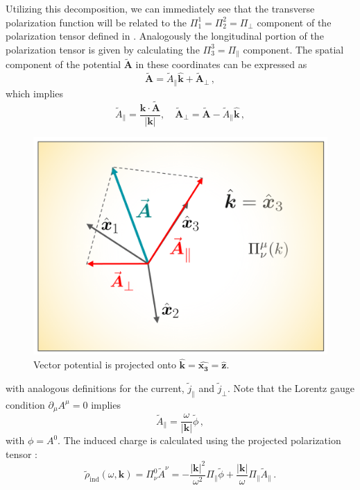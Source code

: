 Utilizing this decomposition, we can immediately see that the transverse polarization function will be related to the $\Pi^1_1 = \Pi^2_2 = \Pi_\perp$ component of the polarization tensor defined in . Analogously the longitudinal portion of the polarization tensor is given by calculating the $\Pi^3_3 = \Pi_\parallel$ component. The spatial component of the potential $\widetilde{\boldsymbol{A}}$  in these coordinates can be expressed as
\begin{equation}
\widetilde{\boldsymbol{A}} = \widetilde{A}_\parallel \hat{\boldsymbol{k}} + \widetilde{\boldsymbol{A}}_\perp\,,
\end{equation}
which implies
\begin{equation}
 \widetilde{A}_{\parallel} = \frac{\boldsymbol{k} \cdot  \widetilde{\boldsymbol{A}}}{|\boldsymbol{k}|}, \quad   \widetilde{\boldsymbol{A}}_{\perp} = \widetilde{\boldsymbol{A}} -  \widetilde{A}_{\parallel}\hat{\boldsymbol{k}}\,,
\end{equation}
\begin{figure}[h!]
    \centering
    \includegraphics[width=0.55\linewidth]{plots/chap01intro/Screenshot 2024-03-14 124133.png}
    \caption{Vector potential is projected onto $\boldsymbol{\hat{k}} = \boldsymbol{\hat{x_3}} =\boldsymbol{\hat{z}}$.}
    \label{fig:project}
\end{figure}
with analogous definitions for the current, $\widetilde{j}_{\parallel}$ and $\widetilde{j}_{\perp}$. Note that the Lorentz gauge condition $\partial_\mu A^\mu = 0$ implies
\begin{equation}\label{eq:apar}
\widetilde{A}_\parallel = \frac{\omega}{ |\boldsymbol{k}|}\widetilde{\phi}\, ,
\end{equation} 
with $\phi=A^0$. The induced charge is calculated using the projected polarization tensor :
\begin{equation}
    \widetilde{\rho}_\text{ind}(\omega,\boldsymbol{k})  = \Pi^0_\nu \widetilde{A}^\nu = -\frac{|\boldsymbol{k}|^2}{\omega^2} \Pi_{\parallel}\widetilde{\phi} +  \frac{|\boldsymbol{k}|}{\omega}\Pi_{\parallel} \widetilde{A}_{\parallel}\,.
\end{equation}
